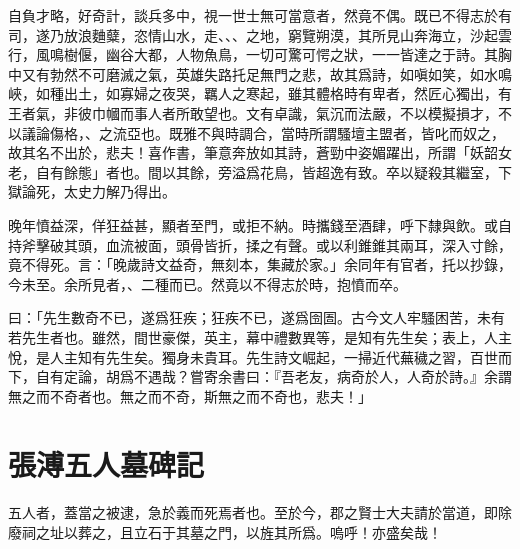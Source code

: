 自負才略，好奇計，談兵多中，視一世{士}無可當意者，然竟不偶。既已不得志於有司，遂乃放浪麯糵，恣情山水，走、、、之地，窮覽朔漠，其所見山奔海立，沙起{雲}行，{風}鳴樹偃，幽谷大都，人物魚鳥，一切可驚可愕之狀，一一皆達之于詩。其胸中又有勃然不可磨滅之氣，英雄失路托足無門之悲，故其爲詩，如嗔如笑，如水鳴峽，如種出土，如寡婦之夜哭，羈人之寒起，雖其體格時有卑者，然匠心獨出，有王者氣，非彼巾幗而事人者所敢望也。文有卓識，氣沉而法嚴，不以模擬損才，不以議論傷格，、之流亞也。既雅不與時調合，當時所謂騷壇主盟者，皆叱而{奴}之，故其名不出於，悲夫！喜作書，筆意奔放如其詩，蒼勁中姿媚躍出，所謂「妖韶女老，自有餘態」者也。間以其餘，旁溢爲花鳥，皆超逸有致。卒以疑殺其繼室，下獄論死，太史力解乃得出。 %

晚年憤益深，佯狂益甚，顯者至門，或拒不納。時攜錢至酒肆，呼下隸與飲。或自持斧擊破其頭，血流被面，頭骨皆折，揉之有聲。或以利錐錐其兩耳，深入寸餘，竟不得死。言：「晚歲詩文益奇，無刻本，集藏於家。」余同年有官者，托以抄錄，今未至。余所見者，、二種而已。然竟以不得志於時，抱憤而卒。

曰：「先生數奇不已，遂爲狂疾；狂疾不已，遂爲囹圄。古今文人牢騷困苦，未有若先生者也。雖然，間世豪傑，英主，幕中禮數異等，是知有先生矣；表上，人主悅，是人主知有先生矣。獨身未貴耳。先生詩文崛起，一掃近代蕪穢之習，百世而下，自有定論，胡爲不遇哉？嘗寄余書曰：『吾老友，病奇於人，人奇於詩。』余謂無之而不奇者也。無之而不奇，斯無之而不奇也，悲夫！」

\theendnotes

\section[五人墓碑記 \quad{\small 張溥}]{{\normalsize 張溥}\quad 五人墓碑記}
五人者，蓋當之被逮，{急}於義而死焉者也。至於今，郡之賢士大夫請於當道，即除廢祠之址以葬之，且立石于其墓之門，以旌其所爲。嗚呼！亦盛矣哉！%

